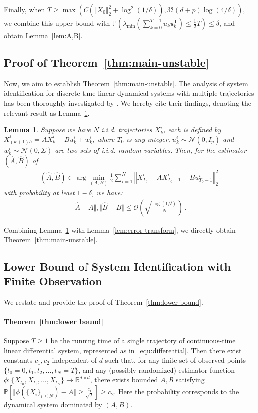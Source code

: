 \documentclass{article}
\newtheorem{lemma}[theorem]{Lemma}
\theoremstyle{definition}
\begin{document}
Finally, when $T\geq \max\left(C\left(\Vert X_{0}\Vert ^{2}_{2}+\log^{2}(1/\delta)\right),32(d+p)\log(4/\delta)\right)$, we combine this upper bound with $\mathbb{P}\left(\lambda_{\min}(\sum_{k=0}^{T-1}u_{k}u^{\mathrm{T}}_{k})\leq\frac{1}{2}T\right)\leq \delta$,
and obtain Lemma~\ref{lem:A,B}.

\subsection{Proof of Theorem~\ref{thm:main-unstable}}\label{subsection: multiple trajectories}
Now, we aim to establish Theorem~\ref{thm:main-unstable}. The analysis of system identification for discrete-time linear dynamical systems with multiple trajectories has been thoroughly investigated by \citep{ref5}. We hereby cite their findings, denoting the relevant result as Lemma~\ref{lem:multi-trajectory}.

\begin{lemma}\label{lem:multi-trajectory}
Suppose we have $N$ i.i.d. trajectories $X^{i}_{k}$, each is defined by $X^{i}_{(k+1)h}=AX^{i}_{k}+Bu^{i}_{k}+w^{i}_{k}$, where $T_{0}$ is any integer, $u^{i}_{k}\sim\mathcal{N}(0,I_{p})$ and $w^{i}_{k}\sim\mathcal{N}(0,\Sigma)$ are two sets of i.i.d. random variables. Then, for the estimator $(\hat{A},\hat{B})$ of 
\begin{align}
(\hat{A},\hat{B})\in \arg\min_{(A,B)}\frac{1}{2}\sum_{i=1}^{N}\left\Vert X^{i}_{T_{0}}-AX^{i}_{T_{0}-1}-Bu^{i}_{T_{0}-1}\right\Vert^{2}_{2}
\end{align}
with probability at least $1-\delta$, we have:
	\begin{align*}
	\Vert \hat{A}-A\Vert ,\Vert \hat{B}-B\Vert \leq \mathcal{O}\left(\sqrt{\frac{\log(1/\delta)}{N}}\right)\,.
	\end{align*}
\end{lemma}

Combining Lemma~\ref{lem:multi-trajectory} with Lemma~\ref{lem:error-transform}, we directly obtain Theorem~\ref{thm:main-unstable}.

\subsection{Lower Bound of System Identification with Finite Observation}
\label{sec:lower bound}
We restate and provide the proof of Theorem~\ref{thm:lower bound}.


\paragraph{Theorem~\ref{thm:lower bound}}
Suppose $T\geq 1$ be the running time of a single trajectory of continuous-time linear differential system, represented as in~\eqref{equ:differential}. Then there exist constants $c_{1},c_{2}$ independent of $d$ such that, for any finite set of observed points $\{t_{0}=0,t_{1},t_{2},...,t_{N}=T\}$, and any (possibly randomized) estimator function $\phi : \{X_{t_{0}},X_{t_{1}},...,X_{t_{N}}\}\to \mathbb{R}^{d\times d}$, there exists bounded $A,B$ satisfying $\mathbb{P}\left[\Vert \phi(\{X_i\}_{i \le N}) - A\Vert\geq \frac{c_{1}}{\sqrt{T}}\right]\geq c_{2}$. Here the probability corresponds to the dynamical system dominated by $(A,B)$.
\end{document}
